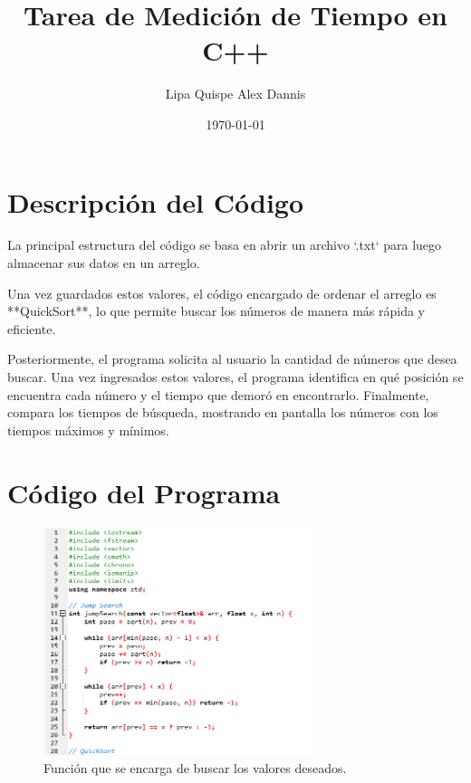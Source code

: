 \documentclass[12pt]{article}
\title{\textbf{Tarea de Medición de Tiempo en C++}}
\author{Lipa Quispe Alex Dannis}
\date{\today}
\begin{document}
\maketitle


\section*{\textbf{Descripción del Código}}
La principal estructura del código se basa en abrir un archivo `.txt` para luego almacenar sus datos en un arreglo.

Una vez guardados estos valores, el código encargado de ordenar el arreglo es **QuickSort**, lo que permite buscar los números de manera más rápida y eficiente.

Posteriormente, el programa solicita al usuario la cantidad de números que desea buscar. Una vez ingresados estos valores, el programa identifica en qué posición se encuentra cada número y el tiempo que demoró en encontrarlo.  
Finalmente, compara los tiempos de búsqueda, mostrando en pantalla los números con los tiempos máximos y mínimos.

\section*{\textbf{Código del Programa}}

\newpage
\begin{figure}[t]
    \centering
    \includegraphics[width=0.7\textwidth]{imagen1.png}
    \caption{Función que se encarga de buscar los valores deseados.}
    \label{fig:codigo-busqueda}
\end{figure}
\end{document}
